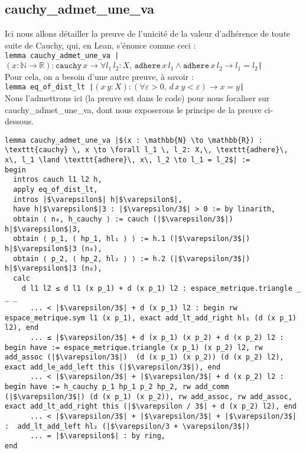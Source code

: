 \subsection{cauchy\_admet\_une\_va}
Ici nous allons détailler la preuve de l'unicité de la valeur d'adhérence de toute suite de Cauchy, qui, en Lean, s'énonce comme ceci : \\
\texttt{lemma cauchy_admet_une_va |$(x : \mathbb{N} \to \mathbb{R}) : \texttt{cauchy} \, x \to \forall l_1 \, l_2: X,\, \texttt{adhere}\, x\, l_1 \land \texttt{adhere}\, x\, l_2 \to l_1 = l_2$|}\\
Pour cela, on a besoin d'une autre preuve, à savoir : \\
\texttt{lemma eq_of_dist_lt |$(x\, y : X) : (\forall \varepsilon > 0,\, d\, x\, y < \varepsilon) \to x = y$| }\\
Nous l'admettrons ici (la preuve est dans le code) pour nous focaliser sur cauchy\_admet\_une\_va, dont nous exposerons le principe de la preuve ci- dessous. 
\begin{verbatim}
lemma cauchy_admet_une_va |$(x : \mathbb{N} \to \mathbb{R}) : \texttt{cauchy} \, x \to \forall l_1 \, l_2: X,\, \texttt{adhere}\, x\, l_1 \land \texttt{adhere}\, x\, l_2 \to l_1 = l_2$| :=
begin
  intros cauch l1 l2 h,
  apply eq_of_dist_lt,
  intros |$\varepsilon$| h|$\varepsilon$|,
  have h|$\varepsilon$|3 : |$\varepsilon/3$| > 0 := by linarith,
  obtain ⟨ n₀, h_cauchy ⟩ := cauch (|$\varepsilon/3$|) h|$\varepsilon$|3,
  obtain ⟨ p_1, ⟨ hp_1, hl₁ ⟩ ⟩ := h.1 (|$\varepsilon/3$|) h|$\varepsilon$|3 (n₀),
  obtain ⟨ p_2, ⟨ hp_2, hl₂ ⟩ ⟩ := h.2 (|$\varepsilon/3$|) h|$\varepsilon$|3 (n₀),
  calc
    d l1 l2 ≤ d l1 (x p_1) + d (x p_1) l2 : espace_metrique.triangle _ _ _
      ... < |$\varepsilon/3$| + d (x p_1) l2 : begin rw espace_metrique.sym l1 (x p_1), exact add_lt_add_right hl₁ (d (x p_1) l2), end 
      ... ≤ |$\varepsilon/3$| + d (x p_1) (x p_2) + d (x p_2) l2 : begin have := espace_metrique.triangle (x p_1) (x p_2) l2, rw add_assoc (|$\varepsilon/3$|)  (d (x p_1) (x p_2)) (d (x p_2) l2), exact add_le_add_left this (|$\varepsilon/3$|), end 
      ... < |$\varepsilon/3$| + |$\varepsilon/3$| + d (x p_2) l2 : begin have := h_cauchy p_1 hp_1 p_2 hp_2, rw add_comm (|$\varepsilon/3$|) (d (x p_1) (x p_2)), rw add_assoc, rw add_assoc, exact add_lt_add_right this (|$\varepsilon / 3$| + d (x p_2) l2), end 
      ... < |$\varepsilon/3$| + |$\varepsilon/3$| + |$\varepsilon/3$| :  add_lt_add_left hl₂ (|$\varepsilon/3 + \varepsilon/3$|)
      ... = |$\varepsilon$| : by ring,
end
\end{verbatim}

